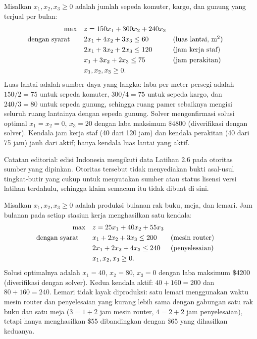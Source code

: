 Misalkan $x_1, x_2, x_3 \geq 0$ adalah jumlah sepeda komuter, kargo, dan gunung yang terjual per bulan:
\begin{align*}
\max \quad & z = 150x_1 + 300x_2 + 240x_3\\
\mbox{dengan syarat}\quad \quad & 2x_1 + 4x_2 + 3x_3 \leq 60 && \mbox{(luas lantai, m$^2$)}\\
& 2x_1 + 3x_2 + 2x_3 \leq 120 && \mbox{(jam kerja staf)}\\
& x_1 + 3x_2 + 2x_3 \leq 75 && \mbox{(jam perakitan)}\\
& x_1, x_2, x_3 \geq 0.
\end{align*}
Luas lantai adalah sumber daya yang langka: laba per meter persegi adalah $150/2 = 75$ untuk sepeda komuter, $300/4 = 75$ untuk sepeda kargo, dan $240/3 = 80$ untuk sepeda gunung, sehingga ruang pamer sebaiknya mengisi seluruh ruang lantainya dengan sepeda gunung. Solver mengonfirmasi solusi optimal $x_1 = x_2 = 0$, $x_3 = 20$ dengan laba maksimum $\$4800$ (diverifikasi dengan solver). Kendala jam kerja staf (40 dari 120 jam) dan kendala perakitan (40 dari 75 jam) jauh dari aktif; hanya kendala luas lantai yang aktif.

\begin{qaflag}
Catatan editorial: edisi Indonesia mengikuti data Latihan 2.6 pada otoritas sumber yang dipinkan. Otoritas tersebut tidak menyediakan bukti asal-usul tingkat-butir yang cukup untuk menyatakan sumber atau status lisensi versi latihan terdahulu, sehingga klaim semacam itu tidak dibuat di sini.
\end{qaflag}


Misalkan $x_1, x_2, x_3 \geq 0$ adalah produksi bulanan rak buku, meja, dan lemari. Jam bulanan pada setiap stasiun kerja menghasilkan satu kendala:
\begin{align*}
\max \quad & z = 25x_1 + 40x_2 + 55x_3\\
\mbox{dengan syarat}\quad \quad & x_1 + 2x_2 + 3x_3 \leq 200 && \mbox{(mesin router)}\\
& 2x_1 + 2x_2 + 4x_3 \leq 240 && \mbox{(penyelesaian)}\\
& x_1, x_2, x_3 \geq 0.
\end{align*}
Solusi optimalnya adalah $x_1 = 40$, $x_2 = 80$, $x_3 = 0$ dengan laba maksimum \$4200 (diverifikasi dengan solver). Kedua kendala aktif: $40 + 160 = 200$ dan $80 + 160 = 240$. Lemari tidak layak diproduksi: satu lemari menggunakan waktu mesin router dan penyelesaian yang kurang lebih sama dengan gabungan satu rak buku dan satu meja ($3 = 1+2$ jam mesin router, $4 = 2+2$ jam penyelesaian), tetapi hanya menghasilkan \$55 dibandingkan dengan \$65 yang dihasilkan keduanya.

